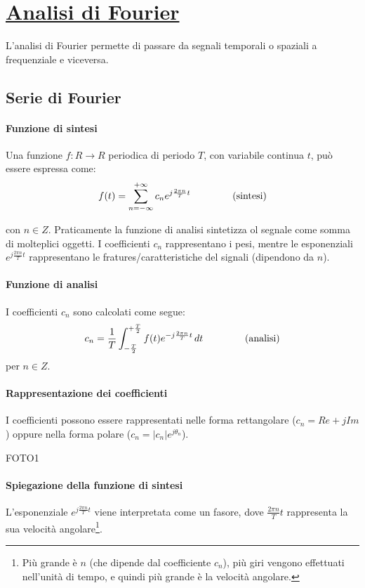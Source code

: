\documentclass[a4paper, 10pt]{report}
\begin{document}
\section*{\underline{Analisi di Fourier}}
L'analisi di Fourier permette di passare da segnali temporali o spaziali a frequenziale e viceversa.

\subsection*{Serie di Fourier}
\paragraph*{Funzione di sintesi} Una funzione $f: R \rightarrow R$ periodica di periodo $T$, con variabile continua $t$, può essere espressa come:
\begin{align*}
f(t) = \sum_{n=-\infty}^{+\infty} c_ne^{j\frac{2 \pi n}{T} t} \hspace{1.5cm}\text{(sintesi)}
\end{align*}

\noindent con $n \in Z$. Praticamente la funzione di analisi sintetizza ol segnale come somma di molteplici oggetti. I coefficienti $c_n$ rappresentano i pesi, mentre le esponenziali $e^{j\frac{2 \pi n}{T} t}$ rappresentano le fratures/caratteristiche del signali (dipendono da $n$).

\paragraph*{Funzione di analisi} I coefficienti $c_n$ sono calcolati come segue:
\begin{align*}
c_n = \frac{1}{T} \int_{-\frac{T}{2}}^{+\frac{T}{2}} f(t)e^{-j\frac{2 \pi n}{T} t} \, dt \hspace{1.5cm}\text{(analisi)}
\end{align*}
\noindent per $n \in Z$. 

\paragraph*{Rappresentazione dei coefficienti} I coefficienti possono essere rappresentati nelle forma rettangolare ($c_n = Re + jIm$) oppure nella forma polare ($c_n = |c_n|e^{j\theta_n}$).
\begin{center}
FOTO1
\end{center}

\paragraph*{Spiegazione della funzione di sintesi} L'esponenziale $e^{j\frac{2 \pi n}{T} t}$ viene interpretata come un fasore, dove $\frac{2 \pi n}{T} t$ rappresenta la sua velocità angolare\footnote{Più grande è $n$ (che dipende dal coefficiente $c_n$), più giri vengono effettuati nell'unità di tempo, e quindi più grande è la velocità angolare.}. 
\end{document}
